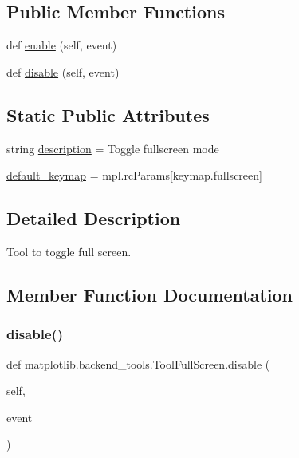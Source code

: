\subsection*{Public Member Functions}
\begin{DoxyCompactItemize}
\item 
def \hyperlink{classmatplotlib_1_1backend__tools_1_1ToolFullScreen_a4e5404a82cde022ae6a303c0f5409baf}{enable} (self, event)
\item 
def \hyperlink{classmatplotlib_1_1backend__tools_1_1ToolFullScreen_a050a1d909710512a568030998f8dada1}{disable} (self, event)
\end{DoxyCompactItemize}
\subsection*{Static Public Attributes}
\begin{DoxyCompactItemize}
\item 
string \hyperlink{classmatplotlib_1_1backend__tools_1_1ToolFullScreen_ac80a814735f4883608a5dd854c6317b3}{description} = \textquotesingle{}Toggle fullscreen mode\textquotesingle{}
\item 
\hyperlink{classmatplotlib_1_1backend__tools_1_1ToolFullScreen_a3ddc14f2c3b27f7574858ec46f869862}{default\+\_\+keymap} = mpl.\+rc\+Params\mbox{[}\textquotesingle{}keymap.\+fullscreen\textquotesingle{}\mbox{]}
\end{DoxyCompactItemize}


\subsection{Detailed Description}
\begin{DoxyVerb}Tool to toggle full screen.\end{DoxyVerb}
 

\subsection{Member Function Documentation}
\mbox{\label{classmatplotlib_1_1backend__tools_1_1ToolFullScreen_a050a1d909710512a568030998f8dada1}} 
\subsubsection{\texorpdfstring{disable()}{disable()}}
{\footnotesize\ttfamily def matplotlib.\+backend\+\_\+tools.\+Tool\+Full\+Screen.\+disable (\begin{DoxyParamCaption}\item[{}]{self,  }\item[{}]{event }\end{DoxyParamCaption})}

